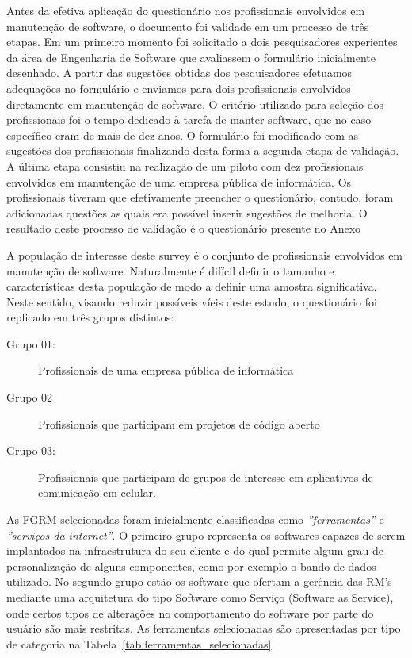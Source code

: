 Antes da efetiva aplicação do questionário nos profissionais envolvidos em
manutenção de software, o documento foi validade em um processo de três etapas.
Em um primeiro momento foi solicitado a dois pesquisadores experientes da área
de Engenharia de Software que avaliassem o formulário inicialmente desenhado. A
partir das sugestões obtidas dos pesquisadores efetuamos adequações no
formulário e enviamos para dois profissionais envolvidos diretamente em
manutenção de software. O critério utilizado para seleção dos profissionais foi
o tempo dedicado à tarefa de manter software, que no caso específico eram de
mais de dez anos. O formulário foi modificado com as sugestões dos profissionais
finalizando desta forma a segunda etapa de validação. A última etapa consistiu
na realização de um piloto com dez profissionais envolvidos em manutenção de uma
empresa pública de informática. Os profissionais tiveram que efetivamente
preencher o questionário, contudo, foram adicionadas questões as quais era
possível inserir sugestões de melhoria. O resultado deste processo de validação
é o questionário presente no Anexo

A população de interesse deste survey é o conjunto de profissionais envolvidos
em manutenção de software. Naturalmente é difícil definir o tamanho e
características desta população de modo a definir uma amostra significativa.
Neste sentido, visando reduzir possíveis víeis deste estudo, o questionário foi
replicado em três grupos distintos:

\begin{description}
	\item[Grupo 01:] Profissionais de uma empresa pública de informática
	\item[Grupo 02] Profissionais que participam em projetos de código aberto
	\item[Grupo 03:] Profissionais que participam de grupos de interesse em
		aplicativos de comunicação em celular.	
\end{description}


As FGRM selecionadas foram inicialmente classificadas como
\textit{''ferramentas''} e \textit{''serviços da internet''}. O primeiro grupo
representa os softwares capazes de serem implantados na infraestrutura do seu
cliente e do qual permite algum grau de personalização de alguns componentes,
como por exemplo o bando de dados utilizado. No segundo grupo estão os software
que ofertam a gerência das RM's mediante uma arquitetura do tipo Software como
Serviço (Software as Service), onde certos tipos de alterações no comportamento
do software por parte do usuário são mais restritas. As ferramentas selecionadas
são apresentadas por tipo de categoria na
Tabela~\ref{tab:ferramentas_selecionadas}

